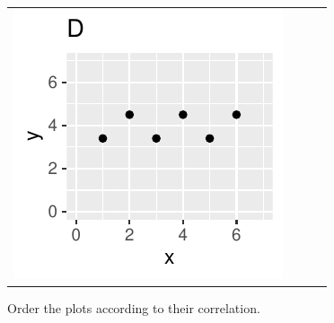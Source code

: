 \begin{frame}
\begin{block}{\example}
\begin{center}
\begin{tabular}{cccc}
        \includegraphics[height=.35\textheight]{figure/exercise-26-2-3} \\
      \end{tabular}
    \end{center}
    Order the plots according to their correlation.
    
  \end{block}
\end{frame}



